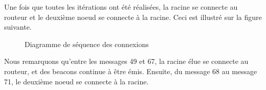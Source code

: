             Une fois que toutes les itérations ont été réalisées, la racine se connecte au routeur et le deuxième noeud
            se connecte à la racine. Ceci est illustré sur la figure suivante.
            \begin{figure}[H]
                \caption{Diagramme de séquence des connexions}         
            \end{figure}
            
            Nous remarquons qu'entre les messages 49 et 67, la racine élue se connecte au routeur, et des beacons continue
            à être émis.
            Ensuite, du message 68 au message 71, le deuxième noeud se connecte à la racine.
        
